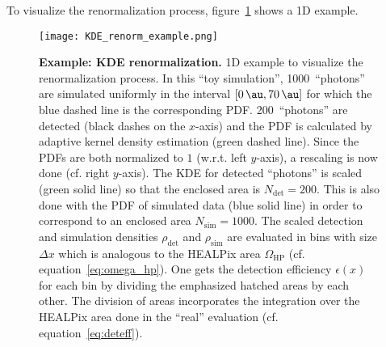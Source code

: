 To visualize the renormalization process, figure~\ref{deteff:1d_example} shows a 1D example.

\begin{figure}[H]
	\centering
	\texttt{[image: KDE\_renorm\_example.png]}
	\caption[Example: KDE renormalization]{\textbf{Example: KDE renormalization.} 1D example to visualize the renormalization process. In this \enquote{toy simulation}, \num{1000}~\enquote{photons} are simulated uniformly in the interval $[\SI{0}{\au},\SI{70}{\au}]$ for which the blue dashed line is the corresponding PDF. \num{200}~\enquote{photons} are detected (black dashes on the $x$-axis) and the PDF is calculated by adaptive kernel density estimation (green dashed line). Since the PDFs are both normalized to $1$ (w.r.t. left $y$-axis), a rescaling is now done (cf. right $y$-axis). The KDE for detected \enquote{photons} is scaled (green solid line) so that the enclosed area is $N_\text{det}=\num{200}$. This is also done with the PDF of simulated data (blue solid line) in order to correspond to an enclosed area $N_\text{sim}=\num{1000}$. The scaled detection and simulation densities $\rho_\text{det}$ and $\rho_\text{sim}$ are evaluated in bins with size $\Delta x$ which is analogous to the HEALPix area $\Omega_\text{HP}$ (cf. equation~\eqref{eq:omega_hp}). One gets the detection efficiency $\epsilon(x)$ for each bin by dividing the emphasized hatched areas by each other. The division of areas incorporates the integration over the HEALPix area done in the \enquote{real} evaluation (cf. equation~\eqref{eq:deteff}).}
	\label{deteff:1d_example}	
\end{figure}